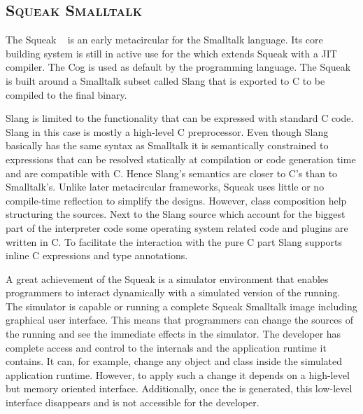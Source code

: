 \subsection*{\textsc{Squeak Smalltalk \VM}}
The Squeak \VM~\cite{Inga97a} is an early metacircular \VM for the Smalltalk language. 
Its core building system is still in active use for the  which extends Squeak with a JIT compiler.
The Cog \VM is used as default by the  programming language.
The Squeak \VM is built around a Smalltalk subset called Slang that is exported to C to be compiled to the final \VM binary.

Slang is limited to the functionality that can be expressed with standard C code.
Slang in this case is mostly a high-level C preprocessor.
Even though Slang basically has the same syntax as Smalltalk it is semantically constrained to expressions that can be resolved statically at compilation or code generation time and are compatible with C.
Hence Slang's semantics are closer to C's than to Smalltalk's.
Unlike later metacircular frameworks, Squeak uses little or no compile-time reflection to simplify the \VM designs.
However, class composition help structuring the sources.
Next to the Slang source which account for the biggest part of the interpreter code some operating system related code and plugins are written in C.
To facilitate the interaction with the pure C part Slang supports inline C expressions and type annotations.

A great achievement of the Squeak \VM is a simulator environment that enables programmers to interact dynamically with a simulated version of the running.
The simulator is capable or running a complete Squeak Smalltalk image including graphical user interface.
This means that programmers can change the sources of the running \VM and see the immediate effects in the simulator.
The \VM developer has complete access and control to the \VM internals and the application runtime it contains. It can, for example, change any object and class inside the simulated application runtime. However, to apply such a change it depends on a high-level but memory oriented interface. Additionally, once the \VM is generated, this low-level interface disappears and is not accessible for the developer.

